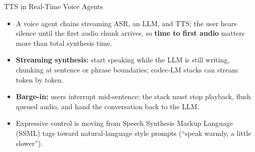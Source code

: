\begin{frame}{TTS in Real-Time Voice Agents}
  \begin{itemize}\itemsep0.5em
    \item A voice agent chains streaming ASR, an LLM, and TTS; the user hears silence until the first audio chunk arrives, so \textbf{time to first audio} matters more than total synthesis time.
    \item \textbf{Streaming synthesis:} start speaking while the LLM is still writing, chunking at sentence or phrase boundaries; codec-LM stacks can stream token by token.
    \item \textbf{Barge-in:} users interrupt mid-sentence; the stack must stop playback, flush queued audio, and hand the conversation back to the LLM.
    \item Expressive control is moving from Speech Synthesis Markup Language (SSML) tags toward natural-language style prompts (``speak warmly, a little slower'').
  \end{itemize}
\end{frame}
